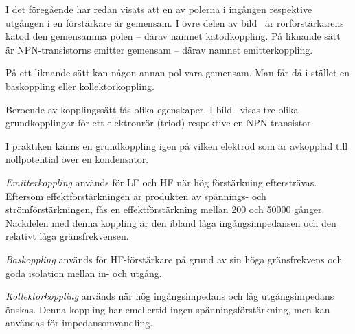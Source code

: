 
I det föregående har redan visats att en av polerna i ingången respektive
utgången i en förstärkare är gemensam.
I övre delen av bild~ är rörförstärkarens katod den gemensamma
polen -- därav namnet katodkoppling.
På liknande sätt är NPN-transistorns emitter gemensam
-- därav namnet emitterkoppling.

På ett liknande sätt kan någon annan pol vara gemensam.
Man får då i stället en baskoppling eller kollektorkoppling.

Beroende av kopplingssätt fås olika egenskaper.
I bild~ visas tre olika grundkopplingar för ett elektronrör (triod)
respektive en NPN-transistor.

I praktiken känns en grundkoppling igen på vilken elektrod som är
avkopplad till nollpotential över en kondensator.

\emph{Emitterkoppling} används för LF och HF när hög förstärkning eftersträvas.
Eftersom effektförstärkningen är produkten av spännings- och
strömförstärkningen, fås en effektförstärkning mellan 200 och 50000
gånger.
Nackdelen med denna koppling är den ibland låga ingångsimpedansen och den
relativt låga gränsfrekvensen.

\emph{Baskoppling} används för HF-förstärkare på grund av sin höga
gränsfrekvens och goda isolation mellan in- och utgång.

\emph{Kollektorkoppling} används när hög ingångsimpe\-da\-ns och låg
utgångsimpedans önskas.
Denna koppling har emellertid ingen spänningsförstärkning, men kan användas för
impedansomvandling.


